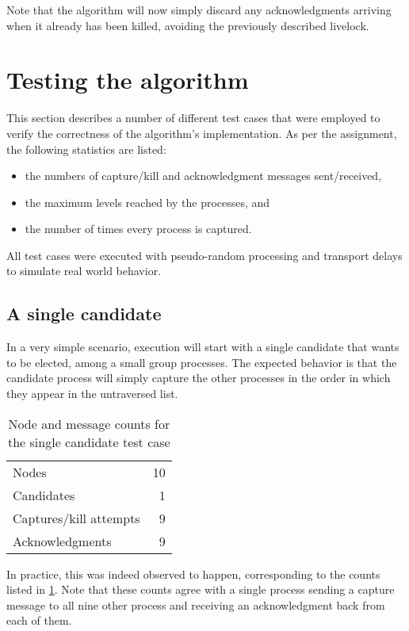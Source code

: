 \documentclass{article}
\begin{document}
Note that the algorithm will now simply discard any acknowledgments arriving when it already has been killed, avoiding the previously described livelock.

\section{Testing the algorithm}
This section describes a number of different test cases that were employed to verify the correctness of the algorithm's implementation. As per the assignment, the following statistics are listed:

\begin{itemize}
	\item the numbers of capture/kill and acknowledgment messages sent/received,
	\item the maximum levels reached by the processes, and
	\item the number of times every process is captured.
\end{itemize}

All test cases were executed with pseudo-random processing and transport delays to simulate real world behavior.

\subsection{A single candidate}
In a very simple scenario, execution will start with a single candidate that wants to be elected, among a small group processes. The expected behavior is that the candidate process will simply capture the other processes in the order in which they appear in the untraversed list.

\begin{table}[H]
	\centering
	\caption{Node and message counts for the single candidate test case}
	\begin{tabular}{l r}
		\toprule
		Nodes 					& 10	\\
		Candidates 				& 1 	\\
		Captures/kill attempts 	& 9		\\
		Acknowledgments 		& 9		\\
		\bottomrule
	\end{tabular}
	\label{tab:counts-single}
\end{table}

In practice, this was indeed observed to happen, corresponding to the counts listed in \cref{tab:counts-single}. Note that these counts agree with a single process sending a capture message to all nine other process and receiving an acknowledgment back from each of them.
\end{document}
